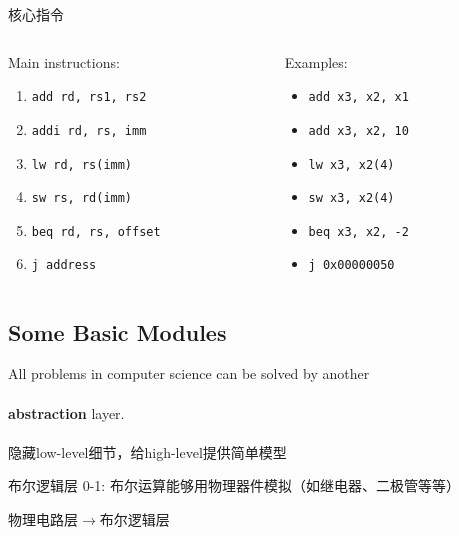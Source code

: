 \documentclass{myslide}
\begin{document}
\begin{frame}[fragile]{核心指令}
\begin{columns}
\begin{column}{0.5\linewidth}
Main instructions:
\begin{enumerate}
	\item \verb'add rd, rs1, rs2'
	\item \verb'addi rd, rs, imm'
	\item \verb'lw rd, rs(imm)'
	\item \verb'sw rs, rd(imm)'
	\item \verb'beq rd, rs, offset'
	\item \verb'j address'
\end{enumerate}
\end{column}
\begin{column}{0.5\linewidth}
Examples:
\begin{itemize}
	\item \verb'add x3, x2, x1'
	\item \verb'add x3, x2, 10'
	\item \verb'lw x3, x2(4)'
	\item \verb'sw x3, x2(4)'
	\item \verb'beq x3, x2, -2'
	\item \verb'j 0x00000050'
\end{itemize}
\end{column}
\end{columns}
\end{frame}

\subsection{Some Basic Modules}
\begin{frame}
\subsectionpage
\end{frame}

\begin{frame}
\begin{center}
All problems in computer science can be solved by another\\
\quad\\
{\textbf{\huge{abstraction}}} layer.\\
\quad\\
隐藏low-level细节，给high-level提供简单模型
\end{center}
\end{frame}

\begin{frame}{布尔逻辑层}
0-1: 布尔运算能够用物理器件模拟（如继电器、二极管等等）
\pause
\begin{center}
物理电路层$\to$布尔逻辑层
\end{center}
\end{frame}
\end{document}

